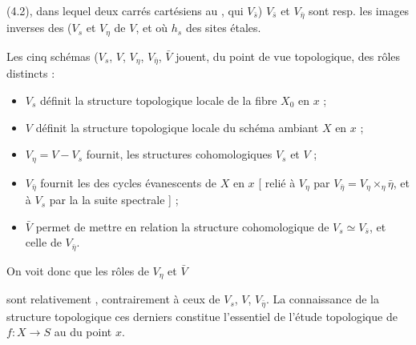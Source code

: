 \documentclass[11pt,a4paper]{article}
\begin{document}
(4.2), dans lequel   deux carrés
 cartésiens \ill{} au \ill{}, \ill{} qui  $V_{\bar s}$)
$V_{\bar s}$ et $V_{\bar\eta}$ sont resp. les images inverses des 
($V_s$ et $V_\eta$ de $V$,  et où $h_s$ \struck{\ill{}} 
\ill{}  des sites étales.

 Les cinq schémas 
($V_s$, $V$, $V_\eta$, $V_{\bar\eta}$, $\bar V$ jouent, du point de vue topologique, des
rôles  distincts :
\begin{itemize}
  \item $V_s$ définit la structure topologique locale de la fibre $X_0$ en $x$ ;
  \item $V$ définit la structure topologique locale du schéma ambiant $X$ en $x$ ;
  \item $V_\eta = V - V_s$ \struck{\ill{}} fournit, \add{\uncertain{\ill{}}} les
  structures cohomologiques  $V_s$ et $V$ ;
  \item $V_{\bar\eta}$ fournit les   des
   cycles évanescents de $X$ en $x$ [\struck{\ill{}} 
  relié à $V_\eta$ par $V_{\bar\eta} = V_\eta \times_\eta \bar\eta$, et à $V_s$ par la
   \ill{} la suite  spectrale ] ;
  \item $\bar V$ permet de mettre en relation la structure cohomologique de
  $V_s \simeq V_{\bar s}$, et celle de $V_{\bar\eta}$.
\end{itemize}


On voit donc que les rôles de $V_\eta$ et $\bar V$


sont relativement \struck{\ill{}} , contrairement à 
  ceux de $V_s$,
$V$, $V_{\bar\eta}$.  La connaissance de la
structure topologique  ces derniers constitue  l'essentiel de \struck{\ill{}} l'étude topologique de $f : X \to S$ au
 du point $x$.
\end{document}
